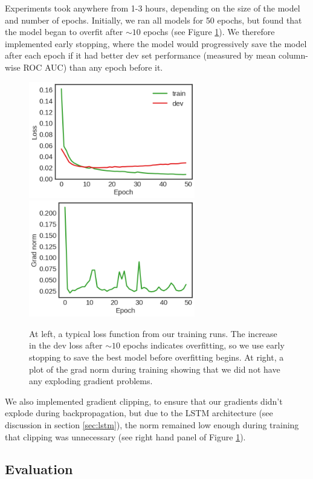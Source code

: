 \documentclass{article} %
\begin{document}
Experiments took anywhere from 1-3 hours, depending on the size of the model and number of epochs. Initially, we ran all models for 50 epochs, but found that the model began to overfit after $\sim 10$ epochs (see Figure \ref{fig:loss}). We therefore implemented early stopping, where the model would progressively save the model after each epoch if it had better dev set performance (measured by mean column-wise ROC AUC) than any epoch before it. 

\begin{figure}
\includegraphics[height=2in]{final_test_6_loss.png}
\includegraphics[height=2in]{final_test_6_grad_norm.png}
\caption{At left, a typical loss function from our training runs. The increase in the dev loss after $\sim 10$ epochs indicates overfitting, so we use early stopping to save the best model before overfitting begins. At right, a plot of the grad norm during training showing that we did not have any exploding gradient problems.}
\label{fig:loss}
\end{figure}

We also implemented gradient clipping, to ensure that our gradients didn't explode during backpropagation, but due to the LSTM architecture (see discussion in section \ref{sec:lstm}), the norm remained low enough during training that clipping was unnecessary (see right hand panel of Figure \ref{fig:loss}).

\subsection{Evaluation}
\end{document}
